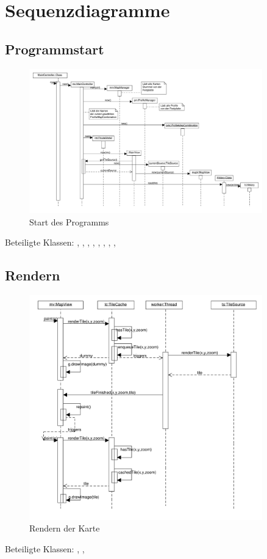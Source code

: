 \documentclass[a4paper, 11pt]{article}
\begin{document}
\section{Sequenzdiagramme}

\subsection{Programmstart}
\begin{figure}[H]
\centering
\includegraphics[angle=90, width=0.9\textwidth]{StartSequenz}
\caption{Start des Programms}
\label{fig:sequenz_start}
\end{figure}
Beteiligte Klassen: , , , , , , , , 

\subsection{Rendern}
\begin{figure}[H]
\centering
\includegraphics[width=0.9\textwidth]{RenderSequenz}
\caption{Rendern der Karte}
\label{fig:sequenz_rendern}
\end{figure}
Beteiligte Klassen: , , 
\end{document}
